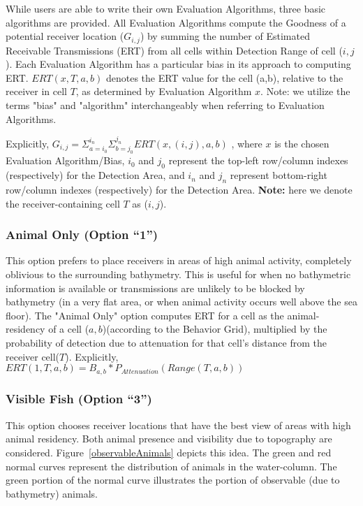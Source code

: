 While users are able to write their own Evaluation Algorithms, three basic algorithms are provided.  All Evaluation Algorithms compute the Goodness of a potential receiver location ($G_{i,j}$) by summing the number of Estimated Receivable Transmissions (ERT) from all cells within Detection Range of cell ($i,j$).  Each Evaluation Algorithm has a particular bias in its approach to computing ERT.  $ERT(x,T,a,b)$ denotes the ERT value for the cell (a,b), relative to the receiver in cell $T$, as determined by Evaluation Algorithm $x$.  Note: we utilize the terms "bias" and "algorithm" interchangeably when referring to Evaluation Algorithms.

Explicitly, $G_{i,j} = \Sigma_{a=i_0}^{i_n} \Sigma_{b=j_0}^{j_n} ERT(x,(i,j),a,b)$ , where $x$ is the chosen Evaluation Algorithm/Bias, $i_0$ and $j_0$ represent the top-left row/column indexes (respectively) for the Detection Area, and $i_n$ and $j_n$ represent bottom-right row/column indexes (respectively) for the Detection Area.  
\newline\textbf{Note:} here we denote the receiver-containing cell $T$ as ($i,j$).

\subsubsection{Animal Only (Option “1”)}
\label{bias1}
This option prefers to place receivers in areas of high animal activity, completely oblivious to the surrounding bathymetry.  This is useful for when no bathymetric information is available or transmissions are unlikely to be blocked by bathymetry (in a very flat area, or when animal activity occurs well above the sea floor).  The "Animal Only" option computes ERT for a cell as the animal-residency of a cell ($a,b$)(according to the Behavior Grid), multiplied by the probability of detection due to attenuation for that cell's distance from the receiver cell($T$).\newline
Explicitly,
$ERT(1,T,a,b) = B_{a,b} * P_{Attenuation}(Range(T,a,b))$

\subsubsection{Visible Fish (Option “3”)}
\label{bias3}
This option chooses receiver locations that have the best view of areas with high animal residency.  Both animal presence and visibility due to topography are considered.  Figure~\ref{observableAnimals} depicts this idea.  The green and red normal curves represent the distribution of animals in the water-column.  The green portion of the normal curve illustrates the portion of observable (due to bathymetry) animals.  

